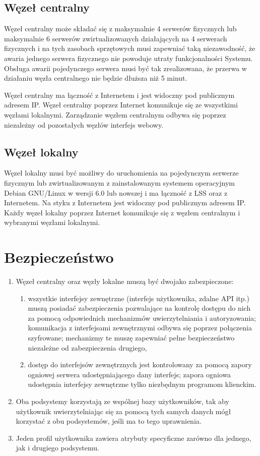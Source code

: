\documentclass[a4paper]{report}
\begin{document}
\subsection{Węzeł centralny}
Węzeł centralny może składać się z maksymalnie 4 serwerów fizycznych lub maksymalnie 6 serwerów zwirtualizowanych działających na 4 serwerach fizycznych i na tych zasobach sprzętowych musi zapewniać taką niezawodność, że awaria jednego serwera fizycznego nie powoduje utraty funkcjonalności Systemu. Obsługa awarii pojedynczego serwera musi być tak zrealizowana, że przerwa w działaniu węzła centralnego nie będzie dłuższa niż 5 minut.

Węzeł centralny ma łączność z Internetem i jest widoczny pod publicznym adresem IP. Węzeł centralny poprzez Internet komunikuje się ze wszystkimi węzłami lokalnymi. Zarządzanie węzłem centralnym odbywa się poprzez niezależny od pozostałych węzłów interfejs webowy.

\subsection{Węzeł lokalny}
Węzeł lokalny musi być możliwy do uruchomienia na pojedynczym serwerze fizycznym lub zwirtualizowanym z zainstalowanym systemem operacyjnym Debian GNU/Linux w wersji 6.0 lub nowszej i ma łączność z LSS oraz z Internetem. Na styku z Internetem jest widoczny pod publicznym adresem IP. Każdy węzeł lokalny poprzez Internet komunikuje się z węzłem centralnym i wybranymi węzłami lokalnymi.

\section{Bezpieczeństwo}
\begin{enumerate}
 \item Węzeł centralny oraz węzły lokalne muszą być dwojako zabezpieczone:
    \begin{enumerate}
    \item wszystkie interfejsy zewnętrzne (interfejs użytkownika, zdalne API itp.) muszą posiadać zabezpieczenia pozwalające na kontrolę dostępu do nich za pomocą odpowiednich mechanizmów uwierzytelniania i autoryzowania; komunikacja z interfejsami zewnętrznymi odbywa się poprzez połączenia szyfrowane; mechanizmy te muszę zapewniać pełne bezpieczeństwo niezależne od zabezpieczenia drugiego,
    \item dostęp do interfejsów zewnętrznych jest kontrolowany za pomocą zapory ogniowej serwera udostępniającego dany interfejs; zapora ogniowa udostępnia interfejsy zewnętrzne tylko niezbędnym programom klienckim.
    \end{enumerate}
 \item Oba podsystemy korzystają ze wspólnej bazy użytkowników, tak aby użytkownik uwierzytelniając się za pomocą tych samych danych mógł korzystać z obu podsystemów, jeśli ma to tego uprawnienia.
 \item Jeden profil użytkownika zawiera atrybuty specyficzne zarówno dla jednego, jak i drugiego podsystemu.
\end{enumerate}
\end{document}
